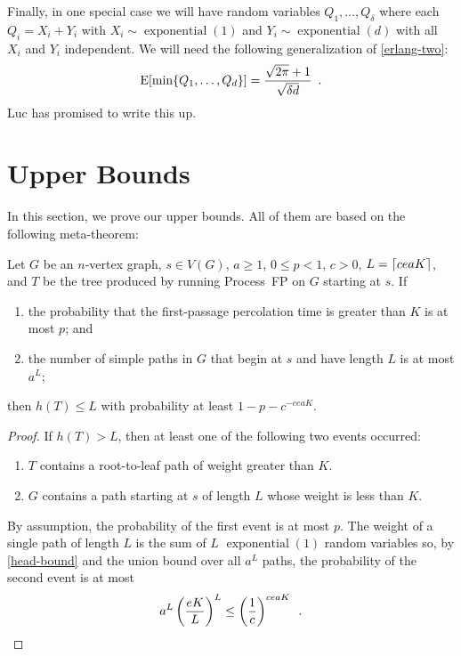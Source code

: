 \documentclass[lotsofwhite]{patmorin}
\DeclareMathOperator{\exponential}{exponential}
\begin{document}
Finally, in one special case we will have random variables
$Q_1,\ldots,Q_\delta$ where each $Q_i=X_i+Y_i$ with $X_i\sim\exponential(1)$
and $Y_i\sim\exponential(d)$ with all $X_i$ and $Y_i$ independent.  We will need the following generalization of
\eqref{erlang-two}:
\begin{equation}
   \E[\min\{Q_1,\ldots,Q_d\}] = \frac{\sqrt{2\pi}+1}{\sqrt{\delta d}}
     \enspace .
     \eqlabel{non-uniform-erlang}
\end{equation}
Luc has promised to write this up.



\section{Upper Bounds}

In this section, we prove our upper bounds. All of them are based on
the following meta-theorem:

\begin{lem}
   Let $G$ be an $n$-vertex graph, $s\in V(G)$, $a\ge 1$, $0\le p<1$, $c>0$, 
   $L={\lceil ceaK \rceil}$, and $T$ be the tree produced by running Process~FP
   on $G$ starting at $s$.  If 
   \begin{enumerate}
      \item the probability that the first-passage percolation time is greater than $K$ is at most $p$; and

      \item the number of simple paths in $G$ that begin at $s$ and have
        length $L$ is at most $a^L$;
   \end{enumerate}
   then $h(T) \le L$ with probability at least $1-p-c^{-ceaK}$.
\end{lem}

\begin{proof}
   If $h(T)> L$, then at least one of the following two events occurred:
   \begin{enumerate}
     \item $T$ contains a root-to-leaf path of weight greater than $K$.
     \item $G$ contains a path starting at $s$ of length $L$ whose weight 
        is less than $K$.
   \end{enumerate}
   By assumption, the probability of the first event is at most $p$.  
   The weight of a single path of length $L$ is the sum of $L$ $\exponential(1)$
   random variables so, by \eqref{head-bound} and the union bound over
   all $a^L$ paths, the probability of the second event is at most
   \[
       a^L \left(\frac{eK}{L} \right)^L \le \left(\frac{1}{c}\right)^{ceaK}
       \enspace . \qedhere
   \]
\end{proof}
\end{document}
